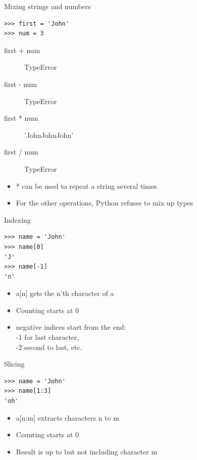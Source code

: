 \documentclass[aspectratio=169,usenames,dvipsnames]{beamer}
\begin{document}
\begin{frame}[fragile]{Mixing strings and numbers}
\begin{lstlisting}
>>> first = 'John'
>>> num = 3
\end{lstlisting}
\begin{description}
    \item[first + num] TypeError
    \item[first - num] TypeError
    \item[first * num] 'JohnJohnJohn'
    \item[first / num] TypeError
\end{description}

\begin{itemize}
\item * can be used to repeat a string several times
\item For the other operations, Python refuses to mix up types
\end{itemize}
\end{frame}


\begin{frame}[fragile]{Indexing}
\begin{lstlisting}
>>> name = 'John'
>>> name[0]
'J'
>>> name[-1]
'n'
\end{lstlisting}
    \begin{itemize}
        \item a[n] gets the n'th character of a
        \item Counting starts at 0
        \item negative indices start from the end:\\
			-1 for last character, \\
            -2 second to last, etc.
    \end{itemize}
\end{frame}

\begin{frame}[fragile]{Slicing}
\begin{lstlisting}
>>> name = 'John'
>>> name[1:3]
'oh'
\end{lstlisting}
    \begin{itemize}
        \item a[n:m] extracts characters n to m
        \item Counting starts at 0
        \item Result is up to but not including character m
    \end{itemize}
\end{frame}
\end{document}
